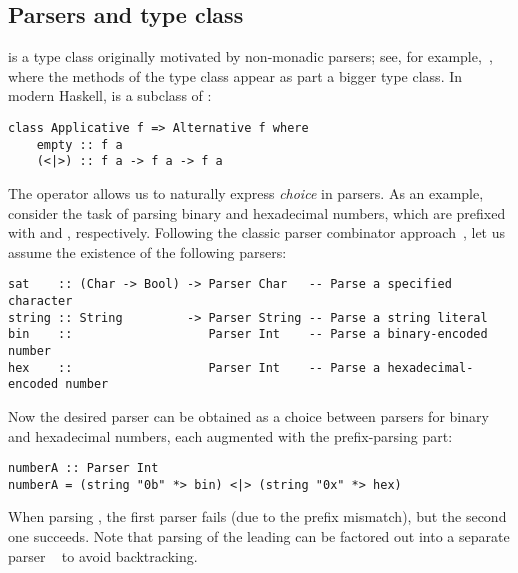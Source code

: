 \subsection{Parsers and  type class}\label{sec-alternative-functors}

 is a type class originally motivated by non-monadic parsers;
see, for example,~\citet{swierstra1996parsers}, where the methods of the
 type class appear as part a bigger  type class. In
modern Haskell,  is a subclass of :

\vspace{1mm}
\begin{verbatim}
class Applicative f => Alternative f where
    empty :: f a
    (<|>) :: f a -> f a -> f a
\end{verbatim}
\vspace{1mm}

\noindent
The operator \hs{<|>} allows us to naturally express \emph{choice} in parsers.
As an example, consider the task of parsing binary and hexadecimal numbers,
which are prefixed with  and , respectively. Following the
classic parser combinator approach~\citep{hutton1998monadic}, let us assume the
existence of the following parsers:

\vspace{1mm}
\begin{verbatim}
sat    :: (Char -> Bool) -> Parser Char   -- Parse a specified character
string :: String         -> Parser String -- Parse a string literal
bin    ::                   Parser Int    -- Parse a binary-encoded number
hex    ::                   Parser Int    -- Parse a hexadecimal-encoded number
\end{verbatim}
\vspace{1mm}

\noindent
Now the desired parser can be obtained as a choice between parsers for binary
and hexadecimal numbers, each augmented with the prefix-parsing part:

\vspace{1mm}
\begin{verbatim}
numberA :: Parser Int
numberA = (string "0b" *> bin) <|> (string "0x" *> hex)
\end{verbatim}
\vspace{1mm}

\noindent
When parsing , the first parser fails (due to the prefix mismatch),
but the second one succeeds. Note that parsing of the leading  can be
factored out into a separate parser ~ to avoid backtracking.

